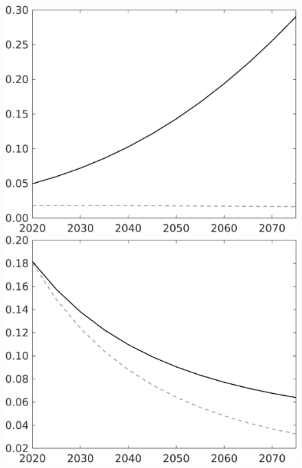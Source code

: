 \documentclass[12pt]{article}
\begin{document}
\begin{figure}[h!!]
\begin{minipage}[]{0.32\textwidth}
	\end{minipage}	
	\begin{minipage}[]{0.32\textwidth}
		\includegraphics[width=1\textwidth]{../../codding_model/own_basedOnFried/optimalPol_010922_revision/figures/all_13Sept22/LevTaufNoTauf_TaulCalib_Equlab_regime0_G_spillover0_nsk0_xgr0_knspil1_sep1_LFlimit0_emsbase0_countec0_GovRev0_etaa0.79_lgd0.png}
	\end{minipage}		
	\begin{minipage}[]{0.32\textwidth}
		\includegraphics[width=1\textwidth]{../../codding_model/own_basedOnFried/optimalPol_010922_revision/figures/all_13Sept22/LevTaufNoTauf_TaulCalib_Equlab_regime0_pf_spillover0_nsk0_xgr0_knspil1_sep1_LFlimit0_emsbase0_countec0_GovRev0_etaa0.79_lgd0.png}

\end{minipage}
\end{figure}
\end{document}
